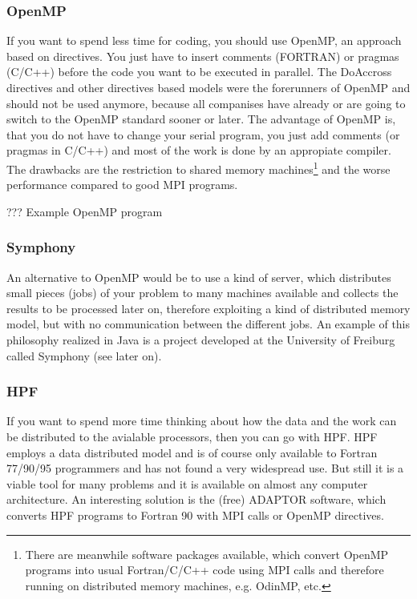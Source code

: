 \subsubsection{OpenMP}
If you want to spend
less time for coding, you should use OpenMP, an approach based on
directives.
You just have to insert comments (FORTRAN) or pragmas (C/C++) before the 
code you want to be executed in parallel.
The DoAccross directives and other directives based models were the
forerunners of OpenMP and should not be used anymore, because
all companises have already or are going to switch to the OpenMP
standard sooner or later. The advantage of OpenMP is,
that you do not have to change your serial program, you just add comments
(or pragmas in C/C++) and most of the work is done by an appropiate compiler.
The drawbacks are the restriction to shared memory machines\footnote{There are
meanwhile software packages available, which convert OpenMP programs into 
usual Fortran/C/C++ code using MPI calls and therefore running on
distributed memory machines, e.g. OdinMP, etc.}
and the worse performance compared to good MPI programs.

??? Example OpenMP program

\subsubsection{Symphony}
An alternative to OpenMP would be to use a kind of server, which distributes
small pieces (jobs) of your problem to many machines available and collects
the results to be processed later on, therefore exploiting a kind of distributed memory
model, but with no communication between the different jobs.
An example of this philosophy
realized in Java is a project developed at the University of Freiburg called
Symphony (see later on). 

\subsubsection{HPF}
If you want to spend more time thinking about how the data and the 
work can be distributed to the avialable processors, then you can go with 
HPF. HPF employs a data distributed model and 
is of course only available to Fortran 77/90/95 programmers and
has not found a very widespread use. But still it is a viable tool for
many problems and it is available on almost any computer architecture.
An interesting solution is the (free) ADAPTOR software, which converts HPF programs
to Fortran 90 with MPI calls or OpenMP directives. 

